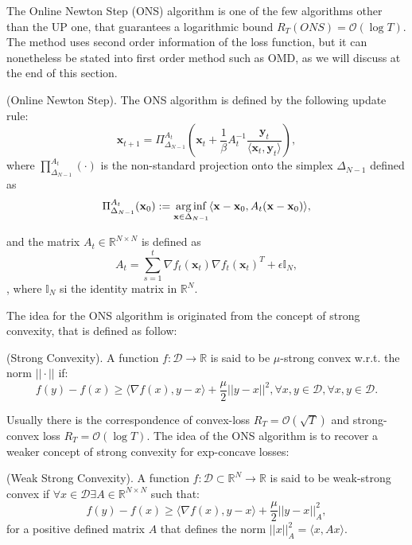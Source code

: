 The Online Newton Step (ONS) \cite{hazan2007logarithmic} algorithm is one of the few algorithms other than the UP one, that guarantees a logarithmic bound $R_T(ONS)=\mathcal O(\log T)$. The method uses second order information of the loss function, but it can nonetheless be stated into first order method such as OMD, as we will discuss at the end of this section.

\begin{definition}(Online Newton Step).
The ONS algorithm is defined by the following update rule:
\begin{equation}\label{eq:update_ONS}
\mathbf x_{t+1}=\Pi^{A_t}_{\Delta_{N-1}}\left(\mathbf x_t+\frac{1}{\beta}A_t^{-1}\frac{\mathbf y_t}{\langle\mathbf x_t,\mathbf y_t\rangle}\right),
\end{equation}
where $\prod^{A_t}_{\Delta_{N-1}}(\cdot)$ is the non-standard projection onto the simplex $\Delta_{N-1}$ defined as 
\begin{equation}\label{eq:non_standard_proj}
\Pi^{A_t}_{\Delta_{N-1}}(\mathbf x_0):=\operatorname*{arg\,inf}\limits_{\mathbf x\in\Delta_{N-1}}\langle\mathbf x-\mathbf x_0,A_t(\mathbf x-\mathbf x_0)\rangle,
\end{equation}

and the matrix $A_t\in\mathbb R^{N\times N}$ is defined as 
\begin{equation}\label{eq:matrix_ONS}
A_t=\sum\limits_{s=1}^t \nabla f_t(\mathbf x_t)\nabla f_t(\mathbf x_t)^T+\epsilon\mathbb I_N,
\end{equation},
where $\mathbb I_N$ si the identity matrix in $\mathbb R^N$.
\end{definition}

The idea for the ONS algorithm is originated from the concept of strong convexity, that is defined as follow:

\begin{definition}(Strong Convexity).\label{def:strong_cnvx}
A function $f:\mathcal D\to\mathbb R$ is said to be $\mu$-strong convex w.r.t. the norm $||\cdot||$ if: 
$$f(y)-f(x)\ge\langle\nabla f(x),y-x\rangle+\frac{\mu}{2}||y-x||^2,\forall x,y\in\mathcal D,\forall x,y\in\mathcal D.$$
\end{definition}

Usually there is the correspondence of convex-loss $R_T=\mathcal O(\sqrt T)$ and strong-convex loss $R_T=\mathcal O(\log T)$. The idea of the ONS algorithm is to recover a weaker concept of strong convexity for exp-concave losses:

\begin{definition}(Weak Strong Convexity).\label{def:weak_strong_cnvx}
A function $f:\mathcal D\subset \mathbb R^N\to\mathbb R$ is said to be weak-strong convex if $\forall x\in\mathcal D\exists A\in\mathbb R^{N\times N}$ such that: 
$$f(y)-f(x)\ge\langle\nabla f(x),y-x\rangle+\frac{\mu}{2}||y-x||_{A}^2,$$
for a positive defined matrix $A$ that defines the norm $||x||^2_{A}=\langle x, Ax\rangle$.
\end{definition}

